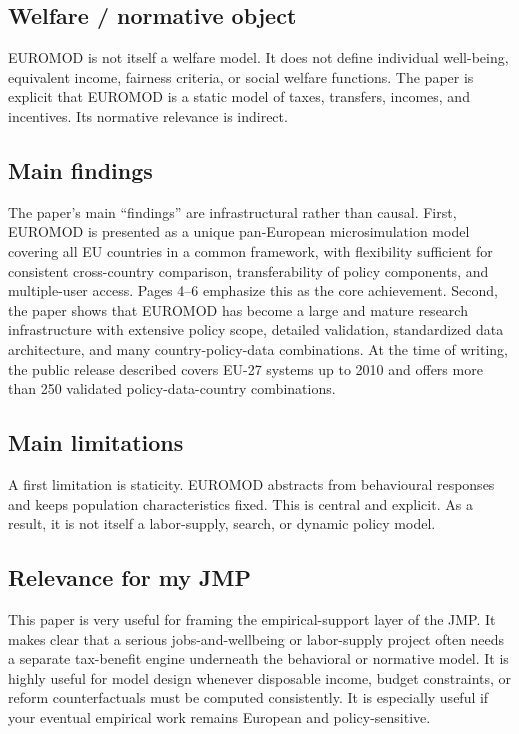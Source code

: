 \documentclass[11pt,a4paper]{article}
\begin{document}
\subsection*{Welfare / normative object}
EUROMOD is not itself a welfare model. It does not define individual well-being, equivalent income, fairness criteria, or social welfare functions. The paper is explicit that EUROMOD is a static model of taxes, transfers, incomes, and incentives. Its normative relevance is indirect.

\subsection*{Main findings}
The paper’s main “findings” are infrastructural rather than causal. First, EUROMOD is presented as a unique pan-European microsimulation model covering all EU countries in a common framework, with flexibility sufficient for consistent cross-country comparison, transferability of policy components, and multiple-user access. Pages 4–6 emphasize this as the core achievement. Second, the paper shows that EUROMOD has become a large and mature research infrastructure with extensive policy scope, detailed validation, standardized data architecture, and many country-policy-data combinations. At the time of writing, the public release described covers EU-27 systems up to 2010 and offers more than 250 validated policy-data-country combinations.

\subsection*{Main limitations}
A first limitation is staticity. EUROMOD abstracts from behavioural responses and keeps population characteristics fixed. This is central and explicit. As a result, it is not itself a labor-supply, search, or dynamic policy model.

\subsection*{Relevance for my JMP}
This paper is very useful for framing the empirical-support layer of the JMP. It makes clear that a serious jobs-and-wellbeing or labor-supply project often needs a separate tax-benefit engine underneath the behavioral or normative model. It is highly useful for model design whenever disposable income, budget constraints, or reform counterfactuals must be computed consistently. It is especially useful if your eventual empirical work remains European and policy-sensitive.
\end{document}
